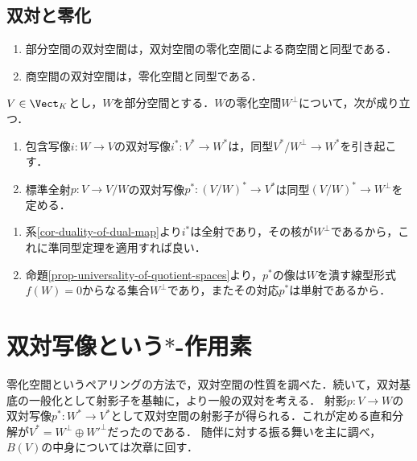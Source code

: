 \documentclass[uplatex, dvipdfmx]{jsreport}
\begin{document}
\subsection{双対と零化}

\begin{tcolorbox}[colframe=ForestGreen, colback=ForestGreen!10!white, breakable]
    \begin{enumerate}
        \item 部分空間の双対空間は，双対空間の零化空間による商空間と同型である．
        \item 商空間の双対空間は，零化空間と同型である．
    \end{enumerate}
\end{tcolorbox}

\begin{proposition}[零化空間は包含写像の双対の核かつ商写像の双対の像]\label{prop-fundamental-theorem-of-dual-maps}
    $V\in\Vect_K$とし，$W$を部分空間とする．$W$の零化空間$W^\bot$について，次が成り立つ．
    \begin{enumerate}
        \item 包含写像$i:W\to V$の双対写像$i^*:V^*\to W^*$は，同型$V^*/W^\bot\to W^*$を引き起こす．
        \item 標準全射$p:V\to V/W$の双対写像$p^*:(V/W)^*\to V^*$は同型$(V/W)^*\to W^\bot$を定める．
    \end{enumerate}
\end{proposition}
\begin{Proof}\mbox{}
    \begin{enumerate}
        \item 系\ref{cor-duality-of-dual-map}より$i^*$は全射であり，その核が$W^\bot$であるから，これに準同型定理を適用すれば良い．
        \item 命題\ref{prop-universality-of-quotient-spaces}より，$p^*$の像は$W$を潰す線型形式$f(W)=0$からなる集合$W^\bot$であり，またその対応$p^*$は単射であるから．
    \end{enumerate}
\end{Proof}

\section{双対写像という$*$-作用素}

\begin{tcolorbox}[colframe=ForestGreen, colback=ForestGreen!10!white,breakable,colbacktitle=ForestGreen!40!white,coltitle=black,fonttitle=\bfseries\sffamily,
title=]
    零化空間というペアリングの方法で，双対空間の性質を調べた．続いて，双対基底の一般化として射影子を基軸に，より一般の双対を考える．
    射影$p:V\to W$の双対写像$p^*:W^*\to V^*$として双対空間の射影子が得られる．これが定める直和分解が$V^*=W^\bot\oplus W'^\bot$だったのである．
    随伴に対する振る舞いを主に調べ，$B(V)$の中身については次章に回す．
\end{tcolorbox}
\end{document}

